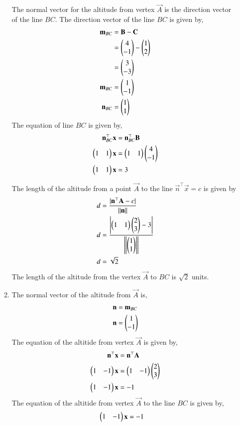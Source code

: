 \documentclass[journal,12pt,twocolumn]{IEEEtran}
\begin{document}
\begin{enumerate}
\begin{enumerate}
The normal vector for the altitude from vertex $\vec{A}$ is the direction vector of the line $BC$. The direction vector of the line $BC$ is given by,
\begin{align}
\mathbf{m}_{BC} &= \mathbf{B} - \mathbf{C}\\
&= \begin{pmatrix}4\\-1\end{pmatrix} - \begin{pmatrix}1\\2\end{pmatrix}\\
&= \begin{pmatrix}3\\-3\end{pmatrix} \\
\mathbf{m}_{BC} &= \begin{pmatrix}1\\-1\end{pmatrix}\\
\mathbf{n}_{BC} &= \begin{pmatrix}1\\1\end{pmatrix}
\end{align}
The equation of line $BC$ is given by,
\begin{align}
{\mathbf{n}^{\top}_{BC}}\mathbf{x} &= {\mathbf{n}^{\top}_{BC}}\mathbf{B}\\
\begin{pmatrix}1&1\end{pmatrix}\mathbf{x} &= \begin{pmatrix}1&1\end{pmatrix}\begin{pmatrix}4\\-1\end{pmatrix}\\
\begin{pmatrix}1&1\end{pmatrix}\mathbf{x}  &= 3
\end{align}

The length of the altitude from a point $\vec{A}$ to the line $\vec{n}^{\top}\vec{x} = c$ is given by
\begin{align}
d &= \frac{|\mathbf{n}^{\top}\mathbf{A} - c|}{\left\lVert\mathbf{n}\right\rVert}\\
d &= \frac{\left|\begin{pmatrix}1&1\end{pmatrix}\begin{pmatrix}2\\3\end{pmatrix} - 3\right|}{\left\lVert\begin{pmatrix}1\\1\end{pmatrix}\right\rVert} \\
d &= \sqrt{2}
\end{align}
The length of the altitude from the vertex $\vec{A}$ to $BC$ is $\sqrt{2}$ units.

\item The normal vector of the altitude from $\vec{A}$ is,
\begin{align}
\mathbf{n} &= \mathbf{m}_{BC}\\
\mathbf{n} &= \begin{pmatrix}1\\-1\end{pmatrix}
\end{align}
The equation of the altitide from vertex $\vec{A}$ is given by,
\begin{align}
\mathbf{n}^{\top}\mathbf{x} &= \mathbf{n}^{\top}\mathbf{A}\\
\begin{pmatrix}1&-1\end{pmatrix}\mathbf{x} &= \begin{pmatrix}1&-1\end{pmatrix}\begin{pmatrix}2\\3\end{pmatrix}\\
\begin{pmatrix}1&-1\end{pmatrix}\mathbf{x} &= -1
\end{align}
The equation of the altitide from vertex $\vec{A}$ to the line $BC$ is given by,
\begin{align}
\begin{pmatrix}1&-1\end{pmatrix}\mathbf{x} &= -1
\end{align}
\end{enumerate}
\end{enumerate}
\end{document}
